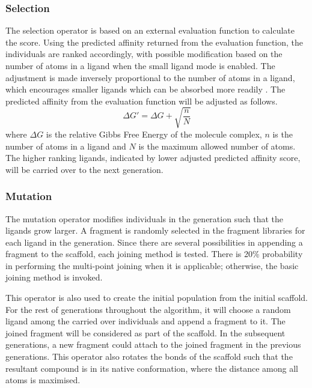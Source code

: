 \documentclass[10pt,conference,letterpaper]{IEEEtran}
\begin{document}
\subsubsection{Selection}
The selection operator is based on an external evaluation function to calculate the score.
Using the predicted affinity returned from the evaluation function, the individuals are ranked accordingly, with possible modification based on the number of atoms in a ligand when the small ligand mode is enabled.
The adjustment is made inversely proportional to the number of atoms in a ligand, which encourages smaller ligands which can be absorbed more readily \cite{ref23}.
The predicted affinity from the evaluation function will be adjusted as follows.
\begin{equation}
\Delta G' = \Delta G + \sqrt{\frac{n}{N}} \label{eqn:04}
\end{equation}
where $\Delta G$ is the relative Gibbs Free Energy of the molecule complex, $n$ is the number of atoms in a ligand and $N$ is the maximum allowed number of atoms.
The higher ranking ligands, indicated by lower adjusted predicted affinity score, will be carried over to the next generation.

\subsubsection{Mutation}
The mutation operator modifies individuals in the generation such that the ligands grow larger.
A fragment is randomly selected in the fragment libraries for each ligand in the generation.
Since there are several possibilities in appending a fragment to the scaffold, each joining method is tested.
There is 20\% probability in performing the multi-point joining when it is applicable; otherwise, the basic joining method is invoked.

This operator is also used to create the initial population from the initial scaffold.
For the rest of generations throughout the algorithm, it will choose a random ligand among the carried over individuals and append a fragment to it.
The joined fragment will be considered as part of the scaffold.
In the subsequent generations, a new fragment could attach to the joined fragment in the previous generations.
This operator also rotates the bonds of the scaffold such that the resultant compound is in its native conformation, where the distance among all atoms is maximised.
\end{document}
